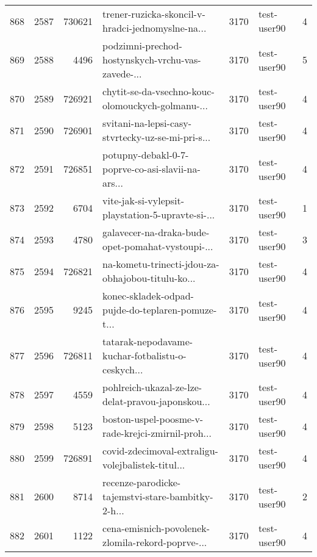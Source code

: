 \begin{tabular}{lrrlrlr}
868  &       2587 &   730621 &  trener-ruzicka-skoncil-v-hradci-jednomyslne-na... &     3170 &                  test-user90 &               4 \\
869  &       2588 &     4496 &  podzimni-prechod-hostynskych-vrchu-vas-zavede-... &     3170 &                  test-user90 &               5 \\
870  &       2589 &   726921 &  chytit-se-da-vsechno-kouc-olomouckych-golmanu-... &     3170 &                  test-user90 &               4 \\
871  &       2590 &   726901 &  svitani-na-lepsi-casy-stvrtecky-uz-se-mi-pri-s... &     3170 &                  test-user90 &               4 \\
872  &       2591 &   726851 &  potupny-debakl-0-7-poprve-co-asi-slavii-na-ars... &     3170 &                  test-user90 &               4 \\
873  &       2592 &     6704 &  vite-jak-si-vylepsit-playstation-5-upravte-si-... &     3170 &                  test-user90 &               1 \\
874  &       2593 &     4780 &  galavecer-na-draka-bude-opet-pomahat-vystoupi-... &     3170 &                  test-user90 &               3 \\
875  &       2594 &   726821 &  na-kometu-trinecti-jdou-za-obhajobou-titulu-ko... &     3170 &                  test-user90 &               4 \\
876  &       2595 &     9245 &  konec-skladek-odpad-pujde-do-teplaren-pomuze-t... &     3170 &                  test-user90 &               4 \\
877  &       2596 &   726811 &  tatarak-nepodavame-kuchar-fotbalistu-o-ceskych... &     3170 &                  test-user90 &               4 \\
878  &       2597 &     4559 &  pohlreich-ukazal-ze-lze-delat-pravou-japonskou... &     3170 &                  test-user90 &               4 \\
879  &       2598 &     5123 &  boston-uspel-poosme-v-rade-krejci-zmirnil-proh... &     3170 &                  test-user90 &               4 \\
880  &       2599 &   726891 &  covid-zdecimoval-extraligu-volejbalistek-titul... &     3170 &                  test-user90 &               4 \\
881  &       2600 &     8714 &  recenze-parodicke-tajemstvi-stare-bambitky-2-h... &     3170 &                  test-user90 &               2 \\
882  &       2601 &     1122 &  cena-emisnich-povolenek-zlomila-rekord-poprve-... &     3170 &                  test-user90 &               4 \\

\end{tabular}
